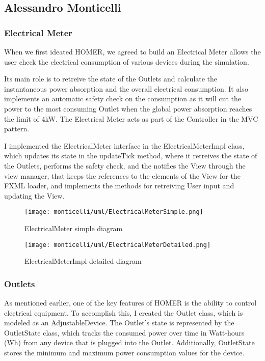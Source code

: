 \subsection{Alessandro Monticelli}
\subsubsection*{Electrical Meter}
When we first ideated HOMER, we agreed to build an Electrical Meter allows the user check the electrical consumption of various devices during the simulation.

Its main role is to retreive the state of the Outlets and calculate the instantaneous power absorption and the overall electrical consumption.
It also implements an automatic safety check on the consumption as it will cut the power to the most consuming Outlet when the global power absorption reaches the limit of 4kW.
The Electrical Meter acts as part of the Controller in the MVC pattern. 

I implemented the ElectricalMeter interface in the ElectricalMeterImpl class, which updates its state in the updateTick method, where it retreives the state of the Outlets, 
performs the safety check, and the notifies the View through the view manager, that keeps the references to the elements of the View for the FXML loader, 
and implements the methods for retreiving User input and updating the View.

\begin{figure}[H]
    \centering{}
    \texttt{[image: monticelli/uml/ElectricalMeterSimple.png]}
    \caption{ElectricalMeter simple diagram}
    \label{monticelli:uml:simpleMeter}
\end{figure}

\begin{figure}[H]
    \centering{}
    \texttt{[image: monticelli/uml/ElectricalMeterDetailed.png]}
    \caption{ElectricalMeterImpl detailed diagram}
    \label{monticelli:uml:detailedMeter}
\end{figure}

\subsubsection{Outlets}
As mentioned earlier, one of the key features of HOMER is the ability to control electrical equipment. \newline
To accomplish this, I created the Outlet class, which is modeled as an AdjustableDevice. \newline
The Outlet's state is represented by the OutletState class, which tracks the consumed power over time in Watt-hours (Wh) 
from any device that is plugged into the Outlet. Additionally, OutletState stores the minimum and maximum power consumption 
values for the device. \newline

